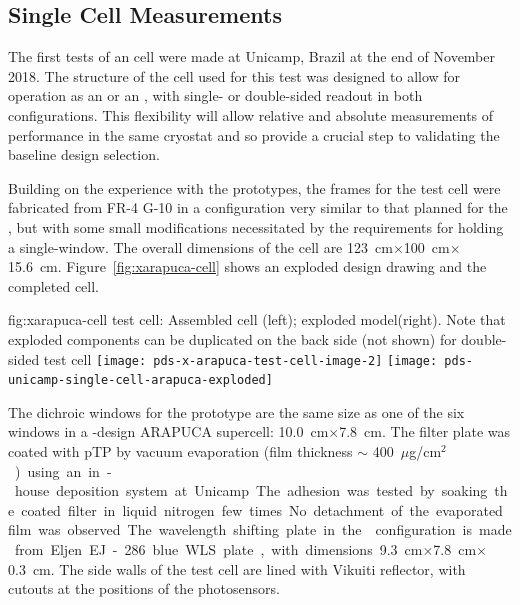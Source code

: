 \subsection{Single Cell  Measurements}
\label{sec:xarapuca-unicamp}

The first tests of an  cell were made at Unicamp, Brazil at the end of November 2018. 
The structure of the cell used for this test was designed to allow for operation as an  or an , with single- or double-sided readout in both configurations.  This flexibility will allow relative and absolute measurements of performance in the same cryostat and so provide a crucial step to validating the baseline design selection.

Building on the experience with the  prototypes, the frames for the test cell were fabricated from FR-4 G-10 in a configuration very similar to that planned for the , but with some small modifications necessitated by the requirements for holding a single-window. The overall dimensions of the cell are \SI{123}{cm}$\times$\SI{100}{cm}$\times$\SI{15.6}{cm}. Figure~\ref{fig:xarapuca-cell} shows an exploded design drawing and the completed cell. 

\begin{dunefigure}{fig:xarapuca-cell}
{ test cell:  Assembled cell (left); exploded model(right).  Note that exploded components can be duplicated on the back side (not shown) for double-sided test cell} 
	\texttt{[image: pds-x-arapuca-test-cell-image-2]}
	\texttt{[image: pds-unicamp-single-cell-arapuca-exploded]}
\end{dunefigure}

The dichroic windows for the prototype are the same size as one of the six windows in a -design ARAPUCA supercell: \SI{10.0}{cm}$\times$\SI{7.8}{cm}. The filter plate was coated with pTP by vacuum evaporation (film thickness $\sim$ \SI{400}{${\mu}$g/cm$^2$})  using an in-house deposition system at Unicamp. The adhesion was tested by soaking the coated filter in liquid nitrogen few times. No detachment of the evaporated film was observed

The wavelength shifting plate in the  configuration is made from Eljen EJ-286 blue WLS plate, with dimensions \SI{9.3}{cm}$\times$\SI{7.8}{cm}$\times$\SI{0.3}{cm}.  The side walls of the test cell are lined with Vikuiti reflector, with cutouts at the positions of the photosensors.

